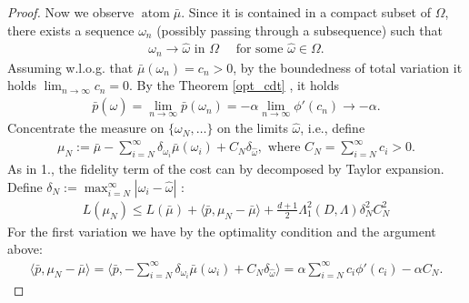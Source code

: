 \documentclass[12pt,fleqn]{amsart}
\theoremstyle{definition}
\DeclareMathOperator*{\atom}{atom}
\begin{document}
\begin{proof}
Now we observe $\atom \bar{\mu}$.
Since it is contained in a compact subset of $\Omega$, there exists a sequence $\omega_n$ (possibly passing through a subsequence) such that 
\begin{align*}
	\omega_n \rightarrow \hat{\omega} \text{ in $\Omega \quad$ for some } \hat{\omega} \in \Omega.
\end{align*}
Assuming w.l.o.g. that $\bar{\mu}(\omega_n) = c_n > 0$, by the boundedness of total variation it holds $ \lim_{n \rightarrow \infty} c_n = 0$. By the Theorem \ref{opt_cdt} , it holds
\begin{align*}
	\bar{p}(\hat{\omega}) = \lim_{n \rightarrow \infty} \bar{p}(\omega_n) = -\alpha \lim_{n\rightarrow \infty} \phi'(c_n) \rightarrow -\alpha.
\end{align*}
Concentrate the measure on $\{\omega_{N}, \dots\}$ on the limits $\hat{\omega}$, i.e., define
\begin{align*}
	\mu_N := \bar{\mu} - \sum_{i = N}^\infty \delta_{\omega_i} \bar{\mu}(\omega_i) + C_N \delta_{\hat{\omega}}, \text{ where } C_N = \sum_{i = N}^\infty c_i > 0.
\end{align*}
As in 1., the fidelity term of the cost can by decomposed by Taylor expansion.\\
Define $\delta_N:= \max_{i = N}^\infty |\omega_i - \hat{\omega}|$ :
\begin{align*}
	L(\mu_N) \le L(\bar{\mu}) + \langle \bar{p}, \mu_N - \bar{\mu}\rangle +\frac{d +1}{2} \Lambda_1^2(D, \Lambda) \delta_N^2  C_N^2
\end{align*}
For the first variation we have by the optimality condition and the argument above:
\begin{align*}
	\langle \bar{p}, \mu_N - \bar{\mu} \rangle = \langle \bar{p},  -\sum_{i = N}^\infty \delta_{\omega_i} \bar{\mu}(\omega_i) + C_N \delta_{\hat{\omega}} \rangle = \alpha \sum_{i = N}^\infty c_i \phi'(c_i) - \alpha C_N.
\end{align*}


\end{proof}
\end{document}
